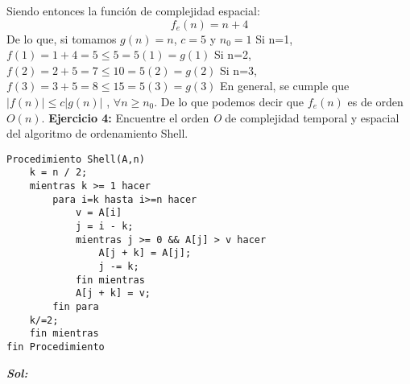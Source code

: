 \documentclass[12pt, letterpaper, twoside]{article}
\begin{document}
Siendo entonces la función de complejidad espacial:
\[f_{e}(n)=n+4\]
De lo que, si tomamos $g(n)=n$, $c=5$ y $n_{0}=1$
\newline
Si n=1,
\center$f(1)=1+4=5\leq 5=5(1)=g(1)$
\justify
Si n=2,
\center$f(2)=2+5=7\leq 10=5(2)=g(2)$
\justify
Si n=3,
\center$f(3)=3+5=8\leq 15=5(3)=g(3)$
\justify
En general, se cumple que
\center$|f(n)|\leq c|g(n)|$ , $\forall n\geq n_{0}$.
\justify
De lo que podemos decir que $f_{e}(n)$ es de orden $O(n)$.
\newpage
\textbf{Ejercicio 4:} Encuentre el orden \textit{O} de complejidad temporal y espacial del algoritmo de ordenamiento Shell.
\begin{lstlisting}
Procedimiento Shell(A,n)
	k = n / 2;
	mientras k >= 1 hacer
		para i=k hasta i>=n hacer
			v = A[i]
			j = i - k;
			mientras j >= 0 && A[j] > v hacer
				A[j + k] = A[j];
				j -= k;
			fin mientras
			A[j + k] = v;
		fin para
	k/=2;
	fin mientras
fin Procedimiento
\end{lstlisting}
\justify
\textbf{\textit{Sol:}}
\end{document}
